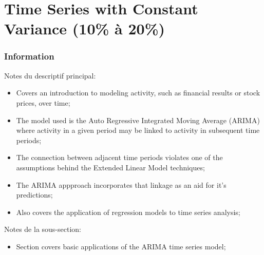 \chapter[Time Series with Constant Variance]{Time Series with Constant Variance (10\% à 20\%)}

\subsection{Information}

\begin{distributions}[Description]
Notes du descriptif principal:
\begin{itemize}
	\item	Covers an introduction to modeling activity, such as financial results or stock prices, over time;
	\item	The model used is the Auto Regressive Integrated Moving Average (ARIMA) where activity in a given period may be linked to activity in subsequent time periods;
	\item	The connection between adjacent time periods violates one of the assumptions behind the Extended Linear Model techniques;
	\item	The ARIMA appproach incorporates that linkage as an aid for it's predictions;
	\item	Also covers the application of regression models to time series analysis;
\end{itemize}
\tcbline
Notes de la sous-section:
\begin{itemize}
	\item	Section covers basic applications of the ARIMA time series model;
\end{itemize}
\end{distributions}

